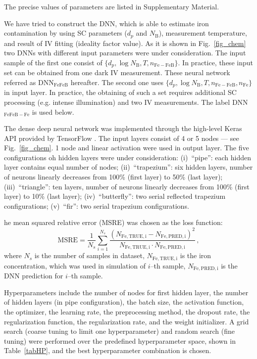 \documentclass[num-refs]{wiley-article} %
\begin{document}
The precise values of parameters are listed in Supplementary Material.

We have tried to construct the DNN, which is able to estimate iron contamination by using
SC parameters ($d_p$ and $N_\mathrm{B}$),  measurement temperature, and result of IV fitting (ideality factor value).
As it is shown in Fig.~\ref{fig_chem} two DNNs with different input parameters were under consideration.
The input sample of the first one consist of $\{d_p,\log N_\mathrm{B},T,n_\mathrm{Fe-FeB}\}$.
In practice, these input set can be obtained from one dark IV measurement.
These neural network referred as DNN$_\mathrm{FeFeB}$ hereafter.
The second one uses  $\{d_p,\log N_\mathrm{B},T,n_\mathrm{Fe-FeB},n_\mathrm{Fe}\}$ in input layer.
In practice, the obtaining of such a set requires additional SC processing (e.g. intense illumination) and two IV measurements.
The label  DNN$_\mathrm{FeFeB-Fe}$ is used below.

The dense deep neural network was implemented through the high-level Keras API provided by TensorFlow \cite{Keras}.
The input layers consist of 4 or 5 nodes --- see Fig.~\ref{fig_chem}.
1 node and linear activation were used in output layer.
The five configurations oh hidden layers were under consideration:
(i)~``pipe'': each hidden layer contains equal number of nodes;
(ii)~``trapezium'': six hidden layers, number of neurons linearly decreases from 100\% (first layer) to 50\% (last layer);
(iii)~``triangle'': ten layers, number of neurons linearly decreases from 100\% (first layer) to 10\% (last layer);
(iv)~``butterfly'': two serial reflected trapezium configurations;
(v)~``fir'': two serial trapezium configurations.

he mean squared relative error (MSRE) was chosen as the loss function:
\begin{equation}
\label{eqMSRE}
    \mathrm{MSRE}=\frac{1}{N_s}\sum_{i=1}^{N_s}\frac{(N_\mathrm{Fe,TRUE,i}-N_\mathrm{Fe,PRED,i})^2}{N_\mathrm{Fe,TRUE,i}\cdot N_\mathrm{Fe,PRED,i}}\,,
\end{equation}
where
$N_s$ is the number of samples in dataset,
$N_\mathrm{Fe,TRUE,i}$ is the iron concentration, which was used in simulation of $i$--th sample,
$N_\mathrm{Fe,PRED,i}$ is the DNN prediction for $i$--th sample.

Hyperparameters include the number of nodes for first hidden layer,
the number of hidden layers (in pipe configuration),
the batch size,
the activation function,
the optimizer,
the learning rate,
the preprocessing method,
the dropout rate,
the regularization function,
the regularization rate,
and the weight initializer.
A grid search (coarse tuning to limit one hyperparameter) and random search (fine tuning) were performed over the predefined hyperparameter space, shown in Table~\ref{tabHP}, and the best hyperparameter combination is chosen.
\end{document}

